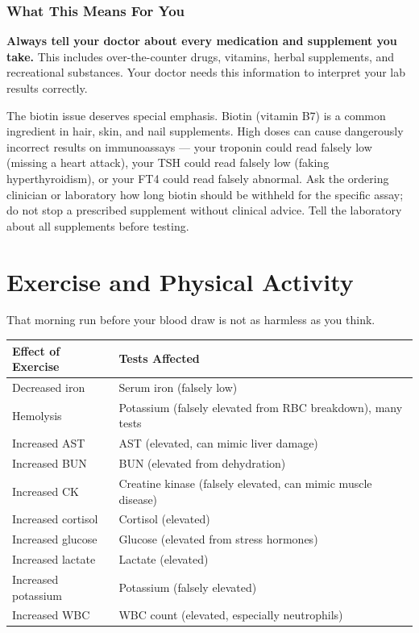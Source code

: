 \subsubsection{What This Means For You}

\textbf{Always tell your doctor about every medication and supplement you take.} This includes over-the-counter drugs, vitamins, herbal supplements, and recreational substances. Your doctor needs this information to interpret your lab results correctly.

The biotin issue deserves special emphasis. Biotin (vitamin B7) is a common ingredient in hair, skin, and nail supplements. High doses can cause dangerously incorrect results on immunoassays --- your troponin could read falsely low (missing a heart attack), your TSH could read falsely low (faking hyperthyroidism), or your FT4 could read falsely abnormal. Ask the ordering clinician or laboratory how long biotin should be withheld for the specific assay; do not stop a prescribed supplement without clinical advice. Tell the laboratory about all supplements before testing.

\clearpage
\section{Exercise and Physical Activity}

That morning run before your blood draw is not as harmless as you think.

\begin{longtable}{@{}ll@{}}
\toprule
\textbf{Effect of Exercise} & \textbf{Tests Affected} \\
\midrule
Decreased iron & Serum iron (falsely low) \\
Hemolysis & Potassium (falsely elevated from RBC breakdown), many tests \\
Increased AST & AST (elevated, can mimic liver damage) \\
Increased BUN & BUN (elevated from dehydration) \\
Increased CK & Creatine kinase (falsely elevated, can mimic muscle disease) \\
Increased cortisol & Cortisol (elevated) \\
Increased glucose & Glucose (elevated from stress hormones) \\
Increased lactate & Lactate (elevated) \\
Increased potassium & Potassium (falsely elevated) \\
Increased WBC & WBC count (elevated, especially neutrophils) \\
\bottomrule
\end{longtable}

